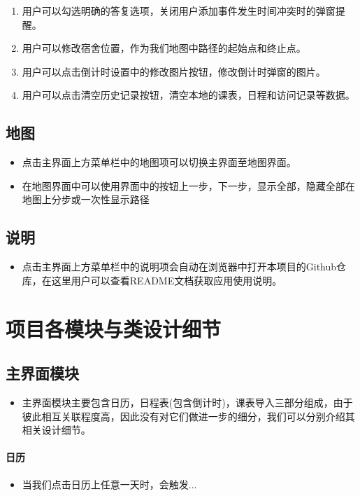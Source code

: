 \documentclass[11pt,hyperref,a4paper,UTF8]{ctexart}
\begin{document}
\begin{CJK}{UTF8}{gkai}
\begin{enumerate}
    \item 用户可以勾选明确的答复选项，关闭用户添加事件发生时间冲突时的弹窗提醒。
    \item 用户可以修改宿舍位置，作为我们地图中路径的起始点和终止点。
    \item 用户可以点击倒计时设置中的修改图片按钮，修改倒计时弹窗的图片。
    \item 用户可以点击清空历史记录按钮，清空本地的课表，日程和访问记录等数据。
\end{enumerate}

\subsection{ 地图}
\begin{itemize}
    \item 点击主界面上方菜单栏中的地图项可以切换主界面至地图界面。
    \item 在地图界面中可以使用界面中的按钮上一步，下一步，显示全部，隐藏全部在地图上分步或一次性显示路径
\end{itemize}

\subsection{ 说明}
\begin{itemize}
    \item 点击主界面上方菜单栏中的说明项会自动在浏览器中打开本项目的Github仓库，在这里用户可以查看README文档获取应用使用说明。
\end{itemize}

\section{ 项目各模块与类设计细节}

\subsection{ 主界面模块}
\begin{itemize}
    \item 主界面模块主要包含日历，日程表(包含倒计时)，课表导入三部分组成，由于彼此相互关联程度高，因此没有对它们做进一步的细分，我们可以分别介绍其相关设计细节。 
\end{itemize}


\paragraph{ 日历}
\begin{itemize}
    \item 当我们点击日历上任意一天时，会触发...
\end{itemize}



\end{CJK}
\end{document}
